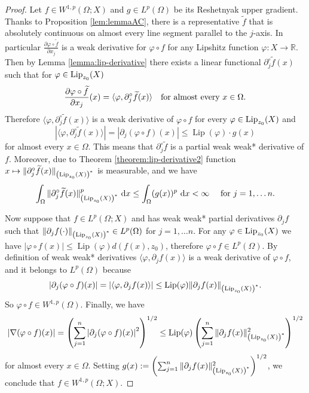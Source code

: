 \documentclass[reqno]{amsart}
\begin{document}
\begin{proof}
Let $f\in W^{1,p}(\Omega;X)$ and $g\in L^p(\Omega)$ be its Reshetnyak upper gradient.
Thanks to Proposition \ref{lem:lemmaAC}, there is a representative $\widetilde{f}$ that is absolutely continuous on almost every line segment parallel to the $j$-axis.
In particular $\frac{\partial \varphi\circ\widetilde{f}}{\partial x_j}$ is a weak derivative for $\varphi\circ f$ 
for any Lipshitz function $\varphi:X\to\mathbb R$. 
Then by Lemma \ref{lemma:lip-derivative} there exists a linear functional $\partial^\circ_j \widetilde{f}(x)$
such that for $\varphi\in \textnormal{Lip}_{z_0}(X)$
\[
\frac{\partial \varphi\circ\widetilde{f}}{\partial x_j}(x) = \langle \varphi, \partial^\circ_j \widetilde{f}(x) \rangle \quad \textnormal{for almost every } x\in\Omega.
\]
Therefore $\langle \varphi, \partial^\circ_j\widetilde{f}(x) \rangle$ is a weak derivative of $\varphi\circ f$  for every $\varphi\in \textnormal{Lip}_{z_0}(X)$ and 
\[
|\langle \varphi, \partial^\circ_j \widetilde{f}(x) \rangle | = |\partial_j (\varphi\circ f)(x) |  \leq  \operatorname{Lip}(\varphi)\cdot g(x)
\]
for almost every  $x\in\Omega$. This means that $\partial^\circ_j \widetilde{f}$ is a partial weak weak* derivative of $f$.
Moreover,  due to Theorem \ref{theorem:lip-derivative2} function 
$x\mapsto \|\partial^\circ_j \widetilde{f}(x)\|_{\left(\textnormal{Lip}_{z_0}(X)\right)^*}$
is measurable, and we have 
\[
\int_\Omega \|\partial^\circ_j \widetilde{f}(x)\|_{\left(\textnormal{Lip}_{z_0}(X)\right)^*}^p \ \textnormal{d}x
\leq \int_\Omega (g(x))^p \ \textnormal{d}x < \infty \quad \textnormal{ for } j=1,\dots n.
 \]
 
 Now suppose that $f\in L^p(\Omega; X)$ and has weak weak* partial derivatives $\partial_jf$ 
 such that $\|\partial_jf(\cdot) \|_{\left(\textnormal{Lip}_{z_0}(X)\right)^*} \in L^p(\Omega)$ for $j=1,\dots n$. 
  For any $\varphi\in \textnormal{Lip}_{z_0}(X)$ we have $|\varphi\circ f(x)| \leq \operatorname{Lip}(\varphi)d(f(x), z_0)$,
  therefore $\varphi\circ f \in L^p(\Omega)$.
  By definition of weak weak* derivatives $\langle \varphi, \partial_jf(x) \rangle$ is a weak derivative of $\varphi\circ f$,
  and it belongs to $L^p(\Omega)$ because 
\[
|\partial_j (\varphi\circ f)(x)| =  |\langle \varphi, \partial_j f(x) \rangle | \leq \operatorname{Lip}(\varphi) \|\partial_jf(x)\|_{\left(\textnormal{Lip}_{z_0}(X)\right)^*}.
\]
So $\varphi\circ f \in W^{1,p}(\Omega)$.
Finally, we have
\begin{equation}
\label{eq:second-norm}
|\nabla (\varphi\circ f)(x)|= \left( \sum_{j=1}^n  \left| \partial_j (\varphi\circ f)(x)\right|^2\right)^{1/2}
\leq  \operatorname{Lip}(\varphi)\left( \sum_{j=1}^n \|\partial_jf(x)\|^2_{\left(\textnormal{Lip}_{z_0}(X)\right)^*}\right)^{1/2}
\end{equation}
for almost every $x\in\Omega$.
Setting $g(x):=\left( \sum_{j=1}^n \|\partial_jf(x)\|^2_{\left(\textnormal{Lip}_{z_0}(X)\right)^*}\right)^{1/2}$, we conclude that $f\in W^{1,p}(\Omega;X)$.
\end{proof}
\end{document}

